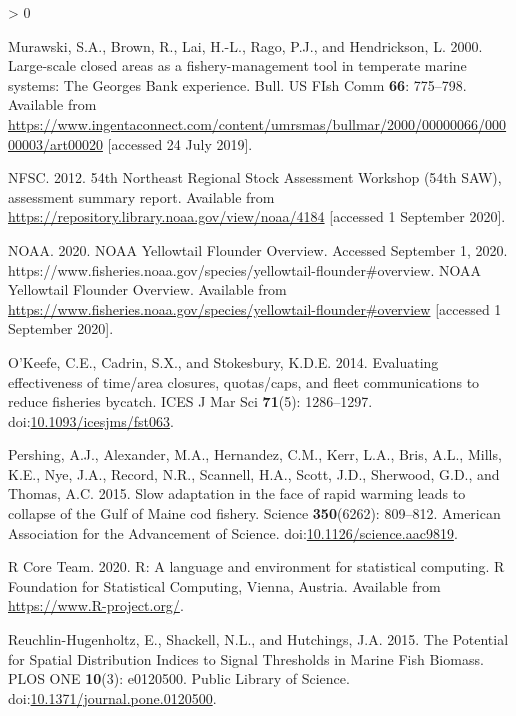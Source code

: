 \documentclass[
]{article}
\newlength{\cslhangindent}
\newenvironment{CSLReferences}[2] %
 {%
  \setlength{\parindent}{0pt}
  \ifodd #1 \everypar{\setlength{\hangindent}{\cslhangindent}}\ignorespaces\fi
  \ifnum #2 > 0
  \setlength{\parskip}{#2\baselineskip}
  \fi
 }%
 {}
\begin{document}
\begin{CSLReferences}{1}{0}
\leavevmode\hypertarget{ref-murawskiLargescaleClosedAreas2000}{}%
Murawski, S.A., Brown, R., Lai, H.-L., Rago, P.J., and Hendrickson, L. 2000. Large-scale closed areas as a fishery-management tool in temperate marine systems: The {Georges Bank} experience. Bull. US FIsh Comm \textbf{66}: 775--798. Available from \url{https://www.ingentaconnect.com/content/umrsmas/bullmar/2000/00000066/00000003/art00020} {[}accessed 24 July 2019{]}.

\leavevmode\hypertarget{ref-nfsc54thNortheastRegional2012}{}%
NFSC. 2012. 54th {Northeast Regional Stock Assessment Workshop} (54th {SAW}), assessment summary report. Available from \url{https://repository.library.noaa.gov/view/noaa/4184} {[}accessed 1 September 2020{]}.

\leavevmode\hypertarget{ref-NOAAYellowtailFlounder2020}{}%
NOAA. 2020. {NOAA Yellowtail Flounder Overview}. {Accessed September} 1, 2020. {https://www.fisheries.noaa.gov/species/yellowtail-flounder\#overview}. {NOAA Yellowtail Flounder Overview}. Available from \url{https://www.fisheries.noaa.gov/species/yellowtail-flounder\#overview} {[}accessed 1 September 2020{]}.

\leavevmode\hypertarget{ref-okeefeEvaluatingEffectivenessTime2014a}{}%
O'Keefe, C.E., Cadrin, S.X., and Stokesbury, K.D.E. 2014. Evaluating effectiveness of time/area closures, quotas/caps, and fleet communications to reduce fisheries bycatch. ICES J Mar Sci \textbf{71}(5): 1286--1297. doi:\href{https://doi.org/10.1093/icesjms/fst063}{10.1093/icesjms/fst063}.

\leavevmode\hypertarget{ref-pershingSlowAdaptationFace2015}{}%
Pershing, A.J., Alexander, M.A., Hernandez, C.M., Kerr, L.A., Bris, A.L., Mills, K.E., Nye, J.A., Record, N.R., Scannell, H.A., Scott, J.D., Sherwood, G.D., and Thomas, A.C. 2015. Slow adaptation in the face of rapid warming leads to collapse of the {Gulf} of {Maine} cod fishery. Science \textbf{350}(6262): 809--812. {American Association for the Advancement of Science}. doi:\href{https://doi.org/10.1126/science.aac9819}{10.1126/science.aac9819}.

\leavevmode\hypertarget{ref-rcoreteamLanguageEnvironmentStatistical2020}{}%
R Core Team. 2020. R: {A} language and environment for statistical computing. {R Foundation for Statistical Computing}, {Vienna, Austria}. Available from \url{https://www.R-project.org/}.

\leavevmode\hypertarget{ref-reuchlin-hugenholtzPotentialSpatialDistribution2015}{}%
Reuchlin-Hugenholtz, E., Shackell, N.L., and Hutchings, J.A. 2015. The {Potential} for {Spatial Distribution Indices} to {Signal Thresholds} in {Marine Fish Biomass}. PLOS ONE \textbf{10}(3): e0120500. {Public Library of Science}. doi:\href{https://doi.org/10.1371/journal.pone.0120500}{10.1371/journal.pone.0120500}.


\end{CSLReferences}
\end{document}
